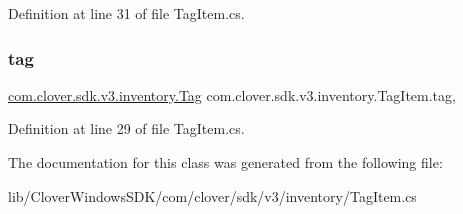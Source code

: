 Definition at line 31 of file Tag\+Item.\+cs.

\mbox{\label{classcom_1_1clover_1_1sdk_1_1v3_1_1inventory_1_1_tag_item_a8f39ec699294a8fcf7f798331c101d2c}} 
\subsubsection{\texorpdfstring{tag}{tag}}
{\footnotesize\ttfamily \hyperlink{classcom_1_1clover_1_1sdk_1_1v3_1_1inventory_1_1_tag}{com.\+clover.\+sdk.\+v3.\+inventory.\+Tag} com.\+clover.\+sdk.\+v3.\+inventory.\+Tag\+Item.\+tag\hspace{0.3cm}{\ttfamily [get]}, {\ttfamily [set]}}



Definition at line 29 of file Tag\+Item.\+cs.



The documentation for this class was generated from the following file\+:\begin{DoxyCompactItemize}
\item 
lib/\+Clover\+Windows\+S\+D\+K/com/clover/sdk/v3/inventory/Tag\+Item.\+cs\end{DoxyCompactItemize}
